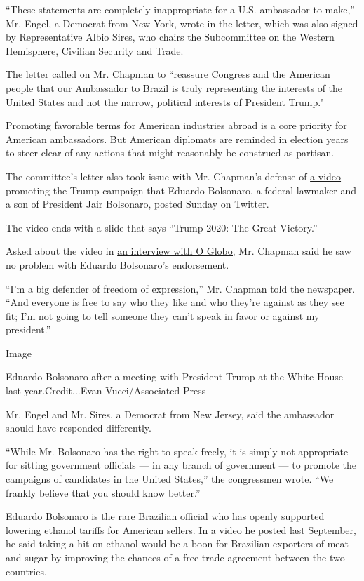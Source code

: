 ``These statements are completely inappropriate for a U.S. ambassador to
make,'' Mr. Engel, a Democrat from New York, wrote in the letter, which
was also signed by Representative Albio Sires, who chairs the
Subcommittee on the Western Hemisphere, Civilian Security and Trade.

The letter called on Mr. Chapman to ``reassure Congress and the American
people that our Ambassador to Brazil is truly representing the interests
of the United States and not the narrow, political interests of
President Trump."

Promoting favorable terms for American industries abroad is a core
priority for American ambassadors. But American diplomats are reminded
in election years to steer clear of any actions that might reasonably be
construed as partisan.

The committee's letter also took issue with Mr. Chapman's defense of
\href{https://twitter.com/BolsonaroSP/status/1287540044677488641?s=20}{a
video} promoting the Trump campaign that Eduardo Bolsonaro, a federal
lawmaker and a son of President Jair Bolsonaro, posted Sunday on
Twitter.

The video ends with a slide that says ``Trump 2020: The Great Victory.''

Asked about the video in
\href{https://oglobo.globo.com/mundo/embaixador-dos-eua-defende-eduardo-bolsonaro-apos-critica-de-deputado-americano-liberdade-de-expressao-24555110}{an
interview with O Globo,} Mr. Chapman said he saw no problem with Eduardo
Bolsonaro's endorsement.

``I'm a big defender of freedom of expression,'' Mr. Chapman told the
newspaper. ``And everyone is free to say who they like and who they're
against as they see fit; I'm not going to tell someone they can't speak
in favor or against my president.''

Image

Eduardo Bolsonaro after a meeting with President Trump at the White
House last year.Credit...Evan Vucci/Associated Press

Mr. Engel and Mr. Sires, a Democrat from New Jersey, said the ambassador
should have responded differently.

``While Mr. Bolsonaro has the right to speak freely, it is simply not
appropriate for sitting government officials --- in any branch of
government --- to promote the campaigns of candidates in the United
States,'' the congressmen wrote. ``We frankly believe that you should
know better.''

Eduardo Bolsonaro is the rare Brazilian official who has openly
supported lowering ethanol tariffs for American sellers.
\href{https://www.facebookcorewwwi.onion/bolsonaro.enb/posts/1250533498472605}{In
a video he posted last September}, he said taking a hit on ethanol would
be a boon for Brazilian exporters of meat and sugar by improving the
chances of a free-trade agreement between the two countries.

